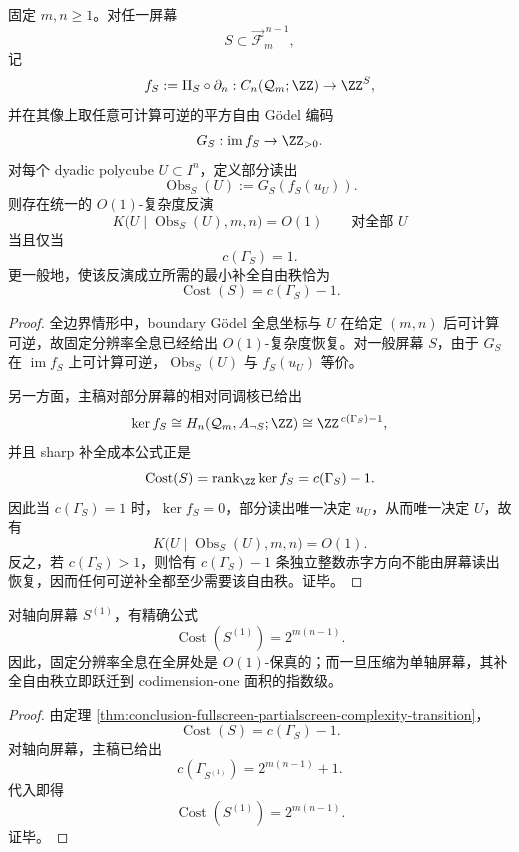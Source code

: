 \begin{theorem}[全屏--部分屏幕的复杂度相变]\label{thm:conclusion-fullscreen-partialscreen-complexity-transition}
固定 \(m,n\ge 1\)。对任一屏幕
\[
S\subset \overrightarrow{\mathcal F}^{\,n-1}_m,
\]
记
\[
f_S:=\Pi_S\circ \partial_n:C_n(\mathcal Q_m;\ZZ)\to \ZZ^S,
\]
并在其像上取任意可计算可逆的平方自由 Gödel 编码
\[
G_S:\operatorname{im}f_S\to \ZZ_{>0}.
\]
对每个 dyadic polycube \(U\subset I^n\)，定义部分读出
\[
\operatorname{Obs}_S(U):=G_S(f_S(u_U)).
\]
则存在统一的 \(O(1)\)-复杂度反演
\[
K\bigl(U\mid \operatorname{Obs}_S(U),m,n\bigr)=O(1)
\qquad\text{对全部 }U
\]
当且仅当
\[
c(\Gamma_S)=1.
\]
更一般地，使该反演成立所需的最小补全自由秩恰为
\[
\operatorname{Cost}(S)=c(\Gamma_S)-1.
\]
\end{theorem}
\begin{proof}
全边界情形中，boundary Gödel 全息坐标与 \(U\) 在给定 \((m,n)\) 后可计算可逆，故固定分辨率全息已经给出 \(O(1)\)-复杂度恢复。对一般屏幕 \(S\)，由于 \(G_S\) 在 \(\operatorname{im}f_S\) 上可计算可逆，\(\operatorname{Obs}_S(U)\) 与 \(f_S(u_U)\) 等价。

另一方面，主稿对部分屏幕的相对同调核已给出
\[
\ker f_S\cong H_n(\mathcal Q_m,A_{\neg S};\ZZ)\cong \ZZ^{\,c(\Gamma_S)-1},
\]
并且 sharp 补全成本公式正是
\[
\operatorname{Cost}(S)=\operatorname{rank}_{\ZZ}\ker f_S=c(\Gamma_S)-1.
\]
因此当 \(c(\Gamma_S)=1\) 时，\(\ker f_S=0\)，部分读出唯一决定 \(u_U\)，从而唯一决定 \(U\)，故有
\[
K\bigl(U\mid \operatorname{Obs}_S(U),m,n\bigr)=O(1).
\]
反之，若 \(c(\Gamma_S)>1\)，则恰有 \(c(\Gamma_S)-1\) 条独立整数赤字方向不能由屏幕读出恢复，因而任何可逆补全都至少需要该自由秩。证毕。
\end{proof}

\begin{corollary}[轴向屏幕赤字的指数律]\label{cor:conclusion-axial-screen-deficit-exponential-law}
对轴向屏幕 \(S^{(1)}\)，有精确公式
\[
\operatorname{Cost}(S^{(1)})=2^{m(n-1)}.
\]
因此，固定分辨率全息在全屏处是 \(O(1)\)-保真的；而一旦压缩为单轴屏幕，其补全自由秩立即跃迁到 codimension-one 面积的指数级。
\end{corollary}
\begin{proof}
由定理 \ref{thm:conclusion-fullscreen-partialscreen-complexity-transition}，
\[
\operatorname{Cost}(S)=c(\Gamma_S)-1.
\]
对轴向屏幕，主稿已给出
\[
c(\Gamma_{S^{(1)}})=2^{m(n-1)}+1.
\]
代入即得
\[
\operatorname{Cost}(S^{(1)})=2^{m(n-1)}.
\]
证毕。
\end{proof}

